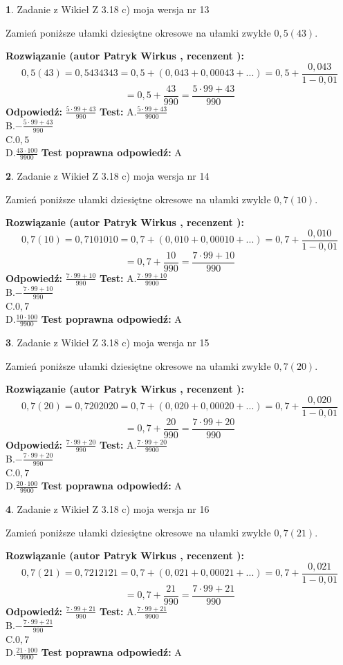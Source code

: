\documentclass[12pt, a4paper]{article}
\theoremstyle{definition} %
\newtheorem{zad}{}
\newcommand{\zadStart}[1]{\begin{zad}#1\newline}
\newcommand{\zadStop}{\end{zad}}
\newcommand{\rozwStart}[2]{\noindent \textbf{Rozwiązanie (autor #1 , recenzent #2): }\newline}
\newcommand{\rozwStop}{\newline}
\newcommand{\odpStart}{\noindent \textbf{Odpowiedź:}\newline}
\newcommand{\odpStop}{\newline}
\newcommand{\testStart}{\noindent \textbf{Test:}\newline}
\newcommand{\testStop}{\newline}
\newcommand{\kluczStart}{\noindent \textbf{Test poprawna odpowiedź:}\newline}
\newcommand{\kluczStop}{\newline}
\begin{document}
\zadStart{Zadanie z Wikieł Z 3.18 c) moja wersja nr 13}

Zamień poniższe ułamki dziesiętne okresowe na ułamki zwykłe $0,5(43)$.
\zadStop
\rozwStart{Patryk Wirkus}{}
$$0,5(43)=0,5434343=0,5+(0,043+0,00043+...)=0,5+\frac{0,043}{1-0,01}$$
$$=0,5+\frac{43}{990}=\frac{5\cdot99+43}{990}$$
\rozwStop
\odpStart
$\frac{5\cdot99+43}{990}$
\odpStop
\testStart
A.$\frac{5\cdot99+43}{9900}$\\ B.$-\frac{5\cdot99+43}{990}$\\ C.$0,5$\\ D.$\frac{43\cdot100}{9900}$
\testStop
\kluczStart
A
\kluczStop



\zadStart{Zadanie z Wikieł Z 3.18 c) moja wersja nr 14}

Zamień poniższe ułamki dziesiętne okresowe na ułamki zwykłe $0,7(10)$.
\zadStop
\rozwStart{Patryk Wirkus}{}
$$0,7(10)=0,7101010=0,7+(0,010+0,00010+...)=0,7+\frac{0,010}{1-0,01}$$
$$=0,7+\frac{10}{990}=\frac{7\cdot99+10}{990}$$
\rozwStop
\odpStart
$\frac{7\cdot99+10}{990}$
\odpStop
\testStart
A.$\frac{7\cdot99+10}{9900}$\\ B.$-\frac{7\cdot99+10}{990}$\\ C.$0,7$\\ D.$\frac{10\cdot100}{9900}$
\testStop
\kluczStart
A
\kluczStop



\zadStart{Zadanie z Wikieł Z 3.18 c) moja wersja nr 15}

Zamień poniższe ułamki dziesiętne okresowe na ułamki zwykłe $0,7(20)$.
\zadStop
\rozwStart{Patryk Wirkus}{}
$$0,7(20)=0,7202020=0,7+(0,020+0,00020+...)=0,7+\frac{0,020}{1-0,01}$$
$$=0,7+\frac{20}{990}=\frac{7\cdot99+20}{990}$$
\rozwStop
\odpStart
$\frac{7\cdot99+20}{990}$
\odpStop
\testStart
A.$\frac{7\cdot99+20}{9900}$\\ B.$-\frac{7\cdot99+20}{990}$\\ C.$0,7$\\ D.$\frac{20\cdot100}{9900}$
\testStop
\kluczStart
A
\kluczStop



\zadStart{Zadanie z Wikieł Z 3.18 c) moja wersja nr 16}

Zamień poniższe ułamki dziesiętne okresowe na ułamki zwykłe $0,7(21)$.
\zadStop
\rozwStart{Patryk Wirkus}{}
$$0,7(21)=0,7212121=0,7+(0,021+0,00021+...)=0,7+\frac{0,021}{1-0,01}$$
$$=0,7+\frac{21}{990}=\frac{7\cdot99+21}{990}$$
\rozwStop
\odpStart
$\frac{7\cdot99+21}{990}$
\odpStop
\testStart
A.$\frac{7\cdot99+21}{9900}$\\ B.$-\frac{7\cdot99+21}{990}$\\ C.$0,7$\\ D.$\frac{21\cdot100}{9900}$
\testStop
\kluczStart
A
\kluczStop
\end{document}
